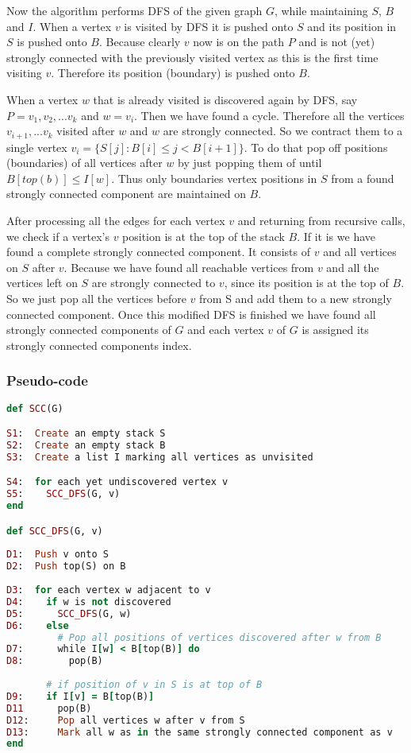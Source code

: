 \documentclass{report}
\theoremstyle{plain}
\theoremstyle{definition}
\theoremstyle{remark}
\numberwithin{definition}{chapter}
\numberwithin{example}{chapter}
\numberwithin{figure}{chapter}
\numberwithin{theorem}{chapter}
\numberwithin{lemma}{chapter}
\begin{document}
Now the algorithm performs DFS of the given graph $G$, while maintaining $S$, $B$ and $I$. When a vertex $v$ is visited by DFS it is pushed onto $S$ and its position in $S$ is pushed onto $B$. Because clearly $v$ now is on the path $P$ and is not (yet) strongly connected with the previously visited vertex as this is the first time visiting $v$. Therefore its position (boundary) is pushed onto $B$.

When a vertex $w$ that is already visited is discovered again by DFS, say $P=v_1,v_2,...v_k$ and $w=v_i$. Then we have found a cycle. Therefore all the vertices $v_{i+1},...v_k$ visited after $w$ and $w$ are strongly connected. So we contract them to a single vertex $v_i=\{ S[j] : B[i] \leq j < B[i+1] \}$. To do that pop off positions (boundaries) of all vertices after $w$ by just popping them of until $B[top(b)] \leq I[w]$. Thus only boundaries vertex positions in $S$ from a found strongly connected component are maintained on $B$.

After processing all the edges for each vertex $v$ and returning from recursive calls, we check if a vertex's $v$ position is at the top of the stack $B$. If it is we have found a complete strongly connected component. It consists of $v$ and all vertices on $S$ after $v$. Because we have found all reachable vertices from $v$ and all the vertices left on $S$ are strongly connected to $v$, since its position is at the top of $B$. So we just pop all the vertices before $v$ from S and add them to a new strongly connected component. Once this modified DFS is finished we have found all strongly connected components of $G$ and each vertex $v$ of $G$ is assigned its strongly connected components index.

\subsubsection*{Pseudo-code}

\begin{lstlisting}[language=Ruby]
def SCC(G)

S1:  Create an empty stack S
S2:  Create an empty stack B
S3:  Create a list I marking all vertices as unvisited

S4:  for each yet undiscovered vertex v
S5:    SCC_DFS(G, v)
end

def SCC_DFS(G, v)
  
D1:  Push v onto S
D2:  Push top(S) on B
  
D3:  for each vertex w adjacent to v
D4:    if w is not discovered
D5:      SCC_DFS(G, w)
D6:    else
         # Pop all positions of vertices discovered after w from B
D7:      while I[w] < B[top(B)] do
D8:        pop(B)
  
       # if position of v in S is at top of B
D9:    if I[v] = B[top(B)]
D11      pop(B)
D12:     Pop all vertices w after v from S
D13:     Mark all w as in the same strongly connected component as v
end
\end{lstlisting}
\end{document}
